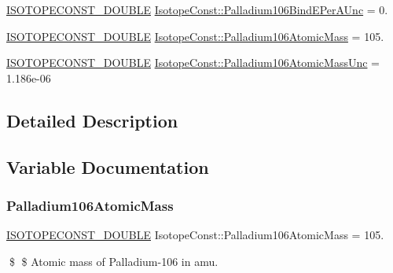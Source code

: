 \begin{DoxyCompactItemize}
\mbox{\hyperlink{group___isotope_const-_macros_ga8f45a7272ce02c0b4c65c44636ed719a}{I\+S\+O\+T\+O\+P\+E\+C\+O\+N\+S\+T\+\_\+\+D\+O\+U\+B\+LE}} \mbox{\hyperlink{group___isotope_const-_palladium-_pd106_ga8c7fdf29c087dfcf792450a3e94601d5}{Isotope\+Const\+::\+Palladium106\+Bind\+E\+Per\+A\+Unc}} = 0.
\item 
\mbox{\hyperlink{group___isotope_const-_macros_ga8f45a7272ce02c0b4c65c44636ed719a}{I\+S\+O\+T\+O\+P\+E\+C\+O\+N\+S\+T\+\_\+\+D\+O\+U\+B\+LE}} \mbox{\hyperlink{group___isotope_const-_palladium-_pd106_gadb17e264a5395ecac61e75a933e63253}{Isotope\+Const\+::\+Palladium106\+Atomic\+Mass}} = 105.
\item 
\mbox{\hyperlink{group___isotope_const-_macros_ga8f45a7272ce02c0b4c65c44636ed719a}{I\+S\+O\+T\+O\+P\+E\+C\+O\+N\+S\+T\+\_\+\+D\+O\+U\+B\+LE}} \mbox{\hyperlink{group___isotope_const-_palladium-_pd106_ga7e7a6ddcf87da302a1df7285245fc164}{Isotope\+Const\+::\+Palladium106\+Atomic\+Mass\+Unc}} = 1.\+186e-\/06
\end{DoxyCompactItemize}


\subsection{Detailed Description}


\subsection{Variable Documentation}
\mbox{\label{group___isotope_const-_palladium-_pd106_gadb17e264a5395ecac61e75a933e63253}} 
\subsubsection{\texorpdfstring{Palladium106\+Atomic\+Mass}{Palladium106AtomicMass}}
{\footnotesize\ttfamily \mbox{\hyperlink{group___isotope_const-_macros_ga8f45a7272ce02c0b4c65c44636ed719a}{I\+S\+O\+T\+O\+P\+E\+C\+O\+N\+S\+T\+\_\+\+D\+O\+U\+B\+LE}} Isotope\+Const\+::\+Palladium106\+Atomic\+Mass = 105.}

\$ \$ Atomic mass of Palladium-\/106 in amu. \mbox{\label{group___isotope_const-_palladium-_pd106_ga7e7a6ddcf87da302a1df7285245fc164}} 
